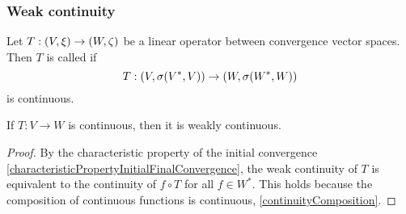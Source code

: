 \subsubsection{Weak continuity}
\begin{definition}
Let $T: \left( V,\xi \right) \to \left( W,\zeta \right)$ be a linear operator between convergence vector spaces. Then $T$ is called  if
\[ T: \left( V, \sigma(V^*,V) \right) \to \left( W, \sigma(W^*,W) \right) \]
is continuous.
\end{definition}

\begin{lemma}
If $T: V\to W$ is continuous, then it is weakly continuous.
\end{lemma}
\begin{proof}
By the characteristic property of the initial convergence \ref{characteristicPropertyInitialFinalConvergence}, the weak continuity of $T$ is equivalent to the continuity of $f\circ T$ for all $f\in W^*$. This holds because the composition of continuous functions is continuous, \ref{continuityComposition}.
\end{proof}

